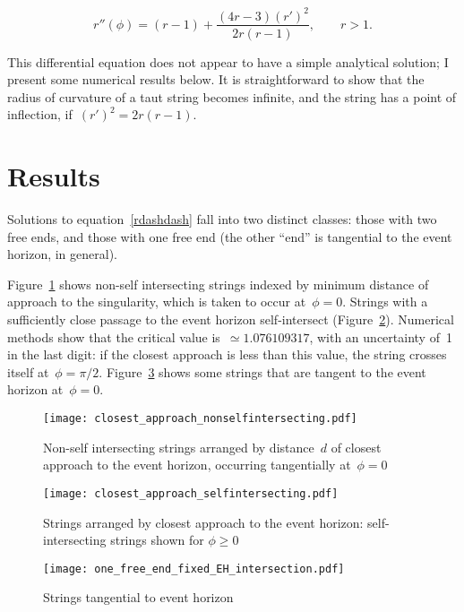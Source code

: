 \documentclass[times,twocolumn,final]{elsarticle}
\begin{document}
\begin{equation}\label{rdashdash}
  r''\left(\phi\right) =
  (r-1) + \frac{(4r-3)\left(r'\right)^2}{2r\left(r-1\right)},\qquad r>1.
\end{equation}

This differential equation does not appear to have a simple analytical
solution; I present some numerical results below.  It is
straightforward to show that the radius of curvature of a taut string
becomes infinite, and the string has a point of inflection,
if~$\left(r'\right)^2=2r\left(r-1\right)$.

\section{Results}
Solutions to equation~\ref{rdashdash} fall into two distinct classes:
those with two free ends, and those with one free end (the other
``end'' is tangential to the event horizon, in general).

Figure~\ref{closest_approach_non_self_intersecting} shows non-self
intersecting strings indexed by minimum distance of approach to the
singularity, which is taken to occur at~$\phi=0$.  Strings with a
sufficiently close passage to the event horizon self-intersect
(Figure~\ref{closest_approach_self_intersecting}).  Numerical methods
show that the critical value is~$\simeq 1.076109317$, with an
uncertainty of~1 in the last digit: if the closest approach is less
than this value, the string crosses itself at~$\phi=\pi/2$.
Figure~\ref{fixed_EH_intersection} shows some strings that are tangent
to the event horizon at~$\phi=0$.

\begin{figure}[h!]
\centering
\texttt{[image: closest\_approach\_nonselfintersecting.pdf]}
\caption{Non-self intersecting strings arranged by distance~$d$ of
  closest approach to the event horizon, occurring tangentially
  at~$\phi=0$}
\label{closest_approach_non_self_intersecting}
\end{figure}

\begin{figure}[h!]
\centering
\texttt{[image: closest\_approach\_selfintersecting.pdf]}
\caption{Strings arranged by closest approach to the event horizon:
 self-intersecting strings shown for $\phi\geq 0$}
\label{closest_approach_self_intersecting}
\end{figure}



\begin{figure}[h!]
\centering
\texttt{[image: one\_free\_end\_fixed\_EH\_intersection.pdf]}
\caption{Strings tangential to event horizon}
\label{fixed_EH_intersection}
\end{figure}
\end{document}
